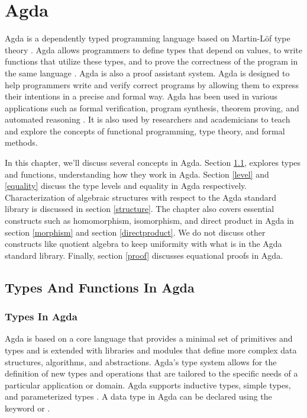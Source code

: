 \chapter{Agda}
Agda is a dependently typed programming language based on Martin-Löf type theory
\cite{AgdaDoc}. Agda allows programmers to define types that depend on values,
to write functions that utilize these types, and to prove the correctness of the
program in the same language \cite{AgdaTB}. Agda is also a proof assistant
system. Agda is designed to help programmers write and verify correct
programs by allowing them to express their intentions in a precise and formal
way. Agda has been used in various applications such as formal verification,
program synthesis, theorem proving, and automated reasoning
\cite{2019arXiv191203028S}. It is also used by researchers and academicians to
teach and explore the concepts of functional programming, type theory, and
formal methods. 

In this chapter, we'll discuss several concepts in Agda. Section \ref{types},
explores types and functions, understanding how they work in Agda. Section
\ref{level} and \ref{equality} discuss the type levels and equality in Agda
respectively. Characterization of algebraic structures with respect to the Agda
standard library is discussed in section \ref{structure}. The chapter also
covers essential constructs such as homomorphism, isomorphism, and direct
product in Agda in section \ref{morphism} and section \ref{directproduct}. We do
not discuss other constructs like quotient algebra \cite{wechler2012universal}
to keep uniformity with what is in the Agda standard library. Finally, section
\ref{proof} discusses equational proofs in Agda.

\section{Types And Functions In Agda}
\label{types}
\subsection{Types In Agda}
Agda is based on a core language that provides a minimal set of primitives and
types and is extended with libraries and modules that define more complex data
structures, algorithms, and abstractions. Agda's type system allows for the
definition of new types and operations that are tailored to the specific needs
of a particular application or domain. Agda supports inductive types, simple
types, and parameterized types \cite{10.1007/978-3-642-03359-9_6}. A data type
in Agda can be declared using the keyword  or . 

